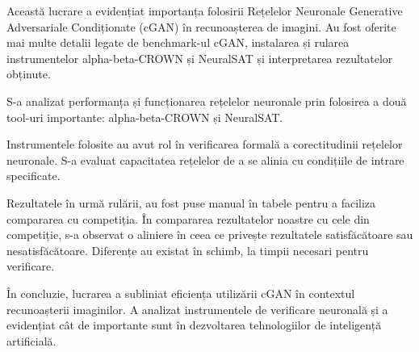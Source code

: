 Această lucrare a evidențiat importanța folosirii Rețelelor Neuronale Generative Adversariale Condiționate (cGAN) în recunoașterea de imagini. Au fost oferite mai multe detalii legate de benchmark-ul cGAN, instalarea și rularea instrumentelor alpha-beta-CROWN și NeuralSAT și interpretarea rezultatelor obținute.

S-a analizat performanța și funcționarea rețelelor neuronale prin folosirea a două tool-uri importante: alpha-beta-CROWN și NeuralSAT. 

Instrumentele folosite au avut rol în verificarea formală a corectitudinii rețelelor neuronale. S-a evaluat capacitatea rețelelor de a se alinia cu condițiile de intrare specificate.

Rezultatele în urmă rulării, au fost puse manual în tabele pentru a faciliza compararea cu competiția. În compararea rezultatelor noastre cu cele din competiție, s-a observat o aliniere în ceea ce privește rezultatele satisfăcătoare sau nesatisfăcătoare. Diferențe au existat în schimb, la timpii necesari pentru verificare.

În concluzie, lucrarea a subliniat eficiența utilizării cGAN în contextul recunoașterii imaginilor. A analizat instrumentele de verificare neuronală și a evidențiat cât de importante sunt în dezvoltarea tehnologiilor de inteligență artificială.